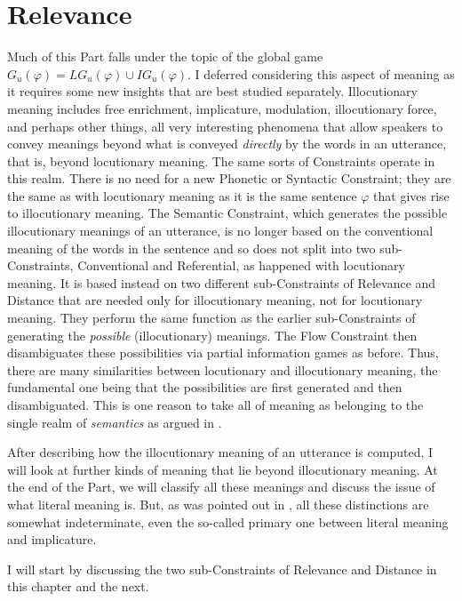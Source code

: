 \chapter{Relevance} \label{ch:relevance}



Much of this Part falls under the topic of the global game $G_u(\varphi) = LG_u(\varphi) \cup IG_u(\varphi)$. I deferred considering this aspect of meaning as it requires some new insights that are best studied separately. Illocutionary meaning includes free enrichment, implicature, modulation, illocutionary force, and perhaps other things, all very interesting phenomena that allow speakers to convey meanings beyond what is conveyed \emph{directly} by the words in an utterance, that is, beyond locutionary meaning. The same sorts of Constraints operate in this realm. There is no need for a new Phonetic or Syntactic Constraint; they are the same as with locutionary meaning as it is the same sentence $\varphi$ that gives rise to illocutionary meaning. The Semantic Constraint, which generates the possible illocutionary meanings of an utterance, is no longer based on the conventional meaning of the words in the sentence and so does not split into two sub-Constraints, Conventional and Referential, as happened with locutionary meaning. It is based instead on two different sub-Constraints of Relevance and Distance that are needed only for illocutionary meaning, not for locutionary meaning. They perform the same function as the earlier sub-Constraints of generating the \emph{possible} (illocutionary) meanings. The Flow Constraint then disambiguates these possibilities via partial information games as before. Thus, there are many similarities between locutionary and illocutionary meaning, the fundamental one being that the possibilities are first generated and then disambiguated. This is one reason to take all of meaning as belonging to the single realm of \emph{semantics} as argued in .

After describing how the illocutionary meaning of an utterance is computed, I will look at further kinds of meaning that lie beyond illocutionary meaning. At the end of the Part, we will classify all these meanings and discuss the issue of what literal meaning is. But, as was pointed out in , all these distinctions are somewhat indeterminate, even the so-called primary one between literal meaning and implicature.

I will start by discussing the two sub-Constraints of Relevance and Distance in this chapter and the next.

